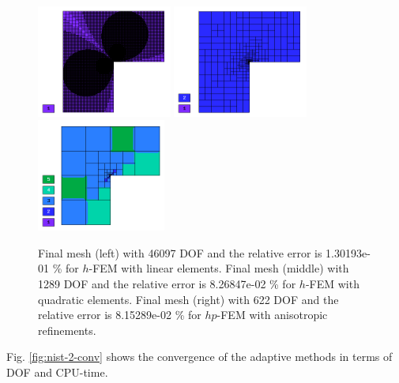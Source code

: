 \documentclass[12pt]{elsarticle}
\begin{document}
\begin{figure}[H]
\centering
\vspace{-5mm}
\includegraphics[height=3.7cm]{nist/nist-2/mesh_h1_aniso.png}
\includegraphics[height=3.7cm]{nist/nist-2/mesh_h2_aniso.png}
\includegraphics[height=3.7cm]{nist/nist-2/mesh_hp_aniso.png}
\vspace{-3mm}
\caption{
Final mesh (left) with 46097 DOF and the relative error is 1.30193e-01 \% for $h$-FEM with linear elements.
Final mesh (middle) with 1289 DOF and the relative error is 8.26847e-02 \% for $h$-FEM with quadratic elements.
Final mesh (right) with 622 DOF and the relative error is 8.15289e-02 \% for $hp$-FEM with anisotropic refinements.}
\label{fig:nist-2-hp-aniso}
\vspace{-3mm}
\end{figure}

Fig. \ref{fig:nist-2-conv} shows the convergence of the adaptive methods in terms of DOF and CPU-time.

\end{document}
